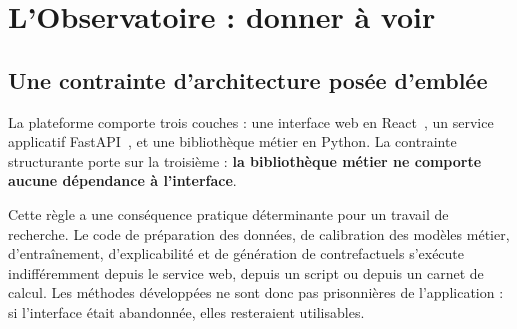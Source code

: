 \chapter{L'Observatoire : donner à voir}
\label{ch:observatoire}


\section{Une contrainte d'architecture posée d'emblée}

La plateforme comporte trois couches : une interface web en React~\cite{react}, un service
applicatif FastAPI~\cite{fastapi}, et une bibliothèque métier en Python. La contrainte structurante porte sur la troisième : \textbf{la
bibliothèque métier ne comporte aucune dépendance à l'interface}.

Cette règle a une conséquence pratique déterminante pour un travail de recherche. Le code de
préparation des données, de calibration des modèles métier, d'entraînement, d'explicabilité et
de génération de contrefactuels s'exécute indifféremment depuis le service web, depuis un script
ou depuis un carnet de calcul. Les méthodes développées ne sont donc pas prisonnières de
l'application : si l'interface était abandonnée, elles resteraient utilisables.

